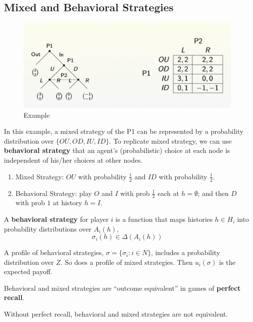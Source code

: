 \documentclass[11pt]{elegantbook_2}
\begin{document}
\subsection{Mixed and Behavioral Strategies}
\begin{figure}[htbp]
    \centering
    \includegraphics[scale=0.2]{BS.png}
    \caption{Example}
    \label{}
\end{figure}
In this example, a mixed strategy of the P1 can be represented by a probability distribution over $\{OU,OD,IU,ID\}$. To replicate mixed strategy, we can use \textbf{behavioral strategy} that an agent's (probabilistic) choice at each node is independent of his/her choices at other nodes.
\begin{example}
    \begin{enumerate}
        \item Mixed Strategy: $OU$ with probability $\frac{1}{2}$ and $ID$ with probability $\frac{1}{2}$.
        \item Behavioral Strategy: play $O$ and $I$ with prob $\frac{1}{2}$ each at $h = \emptyset$;
        and then $D$ with prob $1$ at history $h = I$.
    \end{enumerate}
\end{example}

\begin{definition}
    A \textbf{behavioral strategy} for player $i$ is a function that maps histories $h \in H_i$ into probability distributions over $A_i(h)$,
    $$\sigma_i(h)\in\Delta(A_i(h))$$
\end{definition}

A profile of behavioral strategies, $\sigma=\{\sigma_i:i\in N\}$, includes a probability distribution over $Z$. So does a profile of mixed strategies. Then $u_i(\sigma)$ is the expected payoff.

\begin{theorem}
    Behavioral and mixed strategies are ``outcome equivalent'' in games of \textbf{perfect recall}.
\end{theorem}
Without perfect recall, behavioral and mixed strategies are not equivalent.
\end{document}
